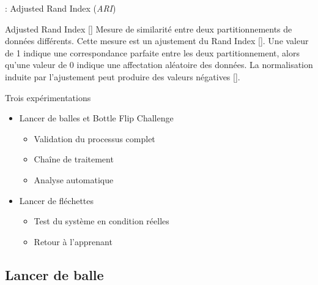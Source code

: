 \documentclass[svgnames]{beamer}
\newcommand{\mycite}[1]{[\textit{\cite{#1}}]}
\begin{document}
	\begin{frame}{\subsubsecname : Adjusted Rand Index (\textit{ARI})}
		\begin{block}{Adjusted Rand Index \mycite{Morey1984ARI}}
			Mesure de similarité entre deux partitionnements de données différents. Cette mesure est un ajustement du Rand Index \mycite{Rand2971RI}. Une valeur de 1 indique une correspondance parfaite entre les deux partitionnement, alors qu'une valeur de 0 indique une affectation aléatoire des données. La normalisation induite par l'ajustement peut produire des valeurs négatives \mycite{Meila2007Cca}. 
		\end{block}
	\end{frame}
	
	\begin{frame}{Trois expérimentations}
		\begin{itemize}[label=$\bullet$]
			\item Lancer de balles et Bottle Flip Challenge
			
			\begin{itemize}[label=$-$]
				\item Validation du processus complet
				\item Chaîne de traitement
				\item Analyse automatique
			\end{itemize}
			
			\item Lancer de fléchettes
			\begin{itemize}[label=$-$]
				\item Test du système en condition réelles
				\item Retour à l'apprenant
			\end{itemize}
			
		\end{itemize}		
	\end{frame}

	\subsection{Lancer de balle}
\end{document}
